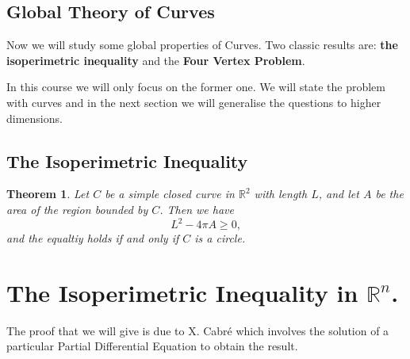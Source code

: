 \documentclass{amsart}
\newtheorem{thm}{Theorem}
\begin{document}
\subsection{Global Theory of Curves}
\label{sec:orgb2f637c}

Now we will study some global properties of Curves. Two classic results are: \textbf{the isoperimetric inequality} and the \textbf{Four Vertex Problem}.

In this course we will only focus on the former one. We will state the problem with curves and in the next section we  will generalise the questions to higher dimensions.


\subsection{The Isoperimetric Inequality}
\label{sec:org9476bd6}

\begin{thm}
Let \(C\) be a simple closed curve in \(\mathbb{R}^2\) with length \(L\), and let \(A\) be the area of the region bounded by \(C\). Then we have
\[ L^2 - 4\pi A \geq 0,\]
and the equaltiy holds if and only if \(C\) is a circle.
\end{thm}


\section{The Isoperimetric Inequality in \(\mathbb{R}^n\).}
\label{sec:org320f72d}

The proof that we will give is due to X. Cabré which involves the solution of a particular Partial Differential Equation to obtain the result.
\end{document}
